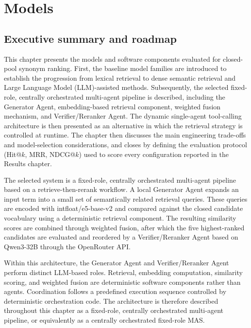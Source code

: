 \chapter{Models}
\label{chap:models}

\section{Executive summary and roadmap}

This chapter presents the models and software components evaluated for closed-pool synonym ranking. First, the baseline model families are introduced to establish the progression from lexical retrieval to dense semantic retrieval and Large Language Model (LLM)-assisted methods. Subsequently, the selected fixed-role, centrally orchestrated multi-agent pipeline is described, including the Generator Agent, embedding-based retrieval component, weighted fusion mechanism, and Verifier/Reranker Agent. The dynamic single-agent tool-calling architecture is then presented as an alternative in which the retrieval strategy is controlled at runtime. The chapter then discusses the main engineering trade-offs and model-selection considerations, and closes by defining the evaluation protocol (Hit@$k$, MRR, NDCG@$k$) used to score every configuration reported in the Results chapter.

The selected system is a fixed-role, centrally orchestrated multi-agent pipeline based on a retrieve-then-rerank workflow. A local Generator Agent expands an input term into a small set of semantically related retrieval queries. These queries are encoded with intfloat/e5-base-v2 and compared against the closed candidate vocabulary using a deterministic retrieval component. The resulting similarity scores are combined through weighted fusion, after which the five highest-ranked candidates are evaluated and reordered by a Verifier/Reranker Agent based on Qwen3-32B through the OpenRouter API.

Within this architecture, the Generator Agent and Verifier/Reranker Agent perform distinct LLM-based roles. Retrieval, embedding computation, similarity scoring, and weighted fusion are deterministic software components rather than agents. Coordination follows a predefined execution sequence controlled by deterministic orchestration code. The architecture is therefore described throughout this chapter as a fixed-role, centrally orchestrated multi-agent pipeline, or equivalently as a centrally orchestrated fixed-role MAS.

